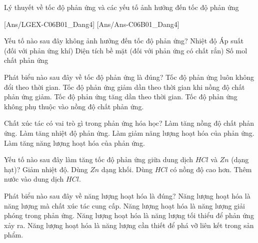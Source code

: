 \documentclass[Main.tex]{subfiles}
\begin{document}
\begin{dang}{Lý thuyết về tốc độ phản ứng và các yếu tố ảnh hưởng đến tốc độ phản ứng}
\end{dang}
[Ans/LGEX-C06B01_Dang4]
[Ans/Ans-C06B01_Dang4]
\begin{ex}
	Yếu tố nào sau đây không ảnh hưởng đến tốc độ phản ứng?
	\choice
	{Nhiệt độ}
	{Áp suất (đối với phản ứng khí)}
	{Diện tích bề mặt (đối với phản ứng có chất rắn)}
	{\True Số mol chất phản ứng}
\end{ex}

\begin{ex}
	Phát biểu nào sau đây về tốc độ phản ứng là đúng?
	\choice
	{Tốc độ phản ứng luôn không đổi theo thời gian.}
	{\True Tốc độ phản ứng giảm dần theo thời gian khi nồng độ chất phản ứng giảm.}
	{Tốc độ phản ứng tăng dần theo thời gian.}
	{Tốc độ phản ứng không phụ thuộc vào nồng độ chất phản ứng.}
\end{ex}

\begin{ex}
	Chất xúc tác có vai trò gì trong phản ứng hóa học?
	\choice
	{Làm tăng nồng độ chất phản ứng.}
	{Làm tăng nhiệt độ phản ứng.}
	{\True Làm giảm năng lượng hoạt hóa của phản ứng.}
	{Làm tăng năng lượng hoạt hóa của phản ứng.}
\end{ex}

\begin{ex}
	Yếu tố nào sau đây làm tăng tốc độ phản ứng giữa dung dịch $HCl$ và $Zn$ (dạng hạt)?
	\choice
	{Giảm nhiệt độ.}
	{Dùng $Zn$ dạng khối.}
	{\True Dùng $HCl$ có nồng độ cao hơn.}
	{Thêm nước vào dung dịch $HCl$.}
\end{ex}

\begin{ex}
	Phát biểu nào sau đây về năng lượng hoạt hóa là đúng?
	\choice
	{Năng lượng hoạt hóa là năng lượng mà chất xúc tác cung cấp.}
	{Năng lượng hoạt hóa là năng lượng giải phóng trong phản ứng.}
	{\True Năng lượng hoạt hóa là năng lượng tối thiểu để phản ứng xảy ra.}
	{Năng lượng hoạt hóa là năng lượng cần thiết để phá vỡ liên kết trong sản phẩm.}
\end{ex}
\end{document}
